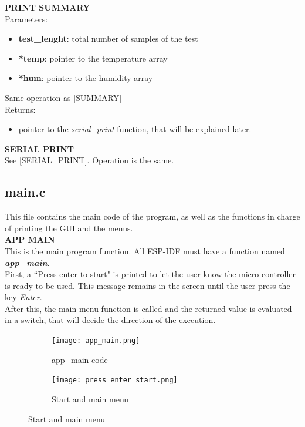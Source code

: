 \documentclass[14pt]{article}
\begin{document}
\begin{normalsize}
		\newpage
		
		\noindent\large \textbf{PRINT SUMMARY}\normalsize\\
		Parameters:
		\begin{itemize}
			\item \textbf{test\_lenght}: total number of samples of the test
			\item \textbf{*temp}: pointer to the temperature array
			\item \textbf{*hum}: pointer to the humidity array
		\end{itemize}
		Same operation as \underline{\ref{SUMMARY}}\\
		
		\noindent Returns:
		\begin{itemize}
			\item pointer to the \textit{serial\_print} function, that will be explained later.
		\end{itemize}
		
		\noindent\large \textbf{SERIAL PRINT}\normalsize\\
		See \underline{\ref{SERIAL_PRINT}}. Operation is the same.
		\newpage
		\subsection{main.c}
		
		This file contains the main code of the program, as well as the functions in charge of printing the GUI and the menus.\\
		
		\noindent \large \textbf{APP MAIN}\normalsize\\
		
		This is the main program function. All ESP-IDF must have a function named \textbf{\textit{app\_main}}.\\
	
		First, a ``Press enter to start" is printed to let the user know the micro-controller is ready to be used. This message remains in the screen until the user press the key \textit{Enter}.\\
		
		After this, the main menu function is called and the returned value is evaluated in a switch, that will decide the direction of the execution.\\ 
		\begin{figure}[h]
			\centering
			\begin{subfigure}{0.45\textwidth}
				\centering
				\texttt{[image: app\_main.png]}
				\caption{app\_main code}
			\end{subfigure}
			\begin{subfigure}{0.45\textwidth}
				\centering
				\texttt{[image: press\_enter\_start.png]}
				\caption{Start and main menu}
			\end{subfigure}
		\end{figure}\vspace{15pt}
		

\end{normalsize}
\end{document}
